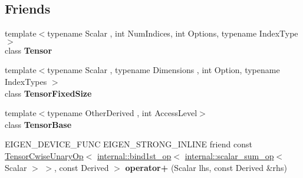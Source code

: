 \subsection*{Friends}
\begin{DoxyCompactItemize}
\item 
\mbox{\label{class_eigen_1_1_tensor_base_3_01_derived_00_01_read_only_accessors_01_4_a52ec8fedf7f21586c4dd55da03b8d8de}} 
{\footnotesize template$<$typename Scalar , int Num\+Indices, int Options, typename Index\+Type $>$ }\\class {\bfseries Tensor}
\item 
\mbox{\label{class_eigen_1_1_tensor_base_3_01_derived_00_01_read_only_accessors_01_4_abf429f77a188e13e320147a061c51df1}} 
{\footnotesize template$<$typename Scalar , typename Dimensions , int Option, typename Index\+Types $>$ }\\class {\bfseries Tensor\+Fixed\+Size}
\item 
\mbox{\label{class_eigen_1_1_tensor_base_3_01_derived_00_01_read_only_accessors_01_4_a3574ea5c818fe3a123bccc1e5474d705}} 
{\footnotesize template$<$typename Other\+Derived , int Access\+Level$>$ }\\class {\bfseries Tensor\+Base}
\item 
\mbox{\label{class_eigen_1_1_tensor_base_3_01_derived_00_01_read_only_accessors_01_4_a81dafbea6830f73e09fca1c26c6c160b}} 
E\+I\+G\+E\+N\+\_\+\+D\+E\+V\+I\+C\+E\+\_\+\+F\+U\+NC E\+I\+G\+E\+N\+\_\+\+S\+T\+R\+O\+N\+G\+\_\+\+I\+N\+L\+I\+NE friend const \hyperlink{class_eigen_1_1_tensor_cwise_unary_op}{Tensor\+Cwise\+Unary\+Op}$<$ \hyperlink{struct_eigen_1_1internal_1_1bind1st__op}{internal\+::bind1st\+\_\+op}$<$ \hyperlink{struct_eigen_1_1internal_1_1scalar__sum__op}{internal\+::scalar\+\_\+sum\+\_\+op}$<$ Scalar $>$ $>$, const Derived $>$ {\bfseries operator+} (Scalar lhs, const Derived \&rhs)
\item 
\mbox{\label{class_eigen_1_1_tensor_base_3_01_derived_00_01_read_only_accessors_01_4_a4094a10d6b45e86b0b6b3a41598241f1}} 

\end{DoxyCompactItemize}
